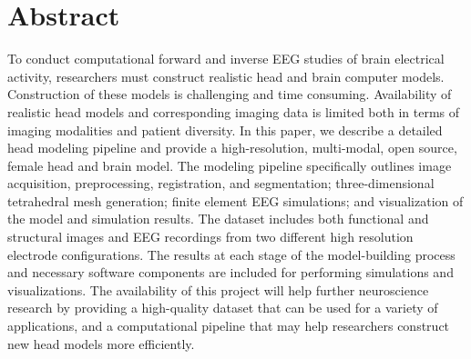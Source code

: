 %

\section*{Abstract}

To conduct computational forward and inverse EEG studies of brain electrical activity, researchers must construct realistic head and brain computer models. Construction of these models is challenging and time consuming. Availability of realistic head models and corresponding imaging data is limited both in terms of imaging modalities and patient diversity. In this paper, we describe a detailed head modeling pipeline and provide a high-resolution, multi-modal, open source, female head and brain model. The modeling pipeline specifically outlines image acquisition, preprocessing, registration, and segmentation; three-dimensional tetrahedral mesh generation; finite element EEG simulations; and visualization of the model and simulation results. The dataset includes both functional and structural images and EEG recordings from two different high resolution electrode configurations. The results at each stage of the model-building process and necessary software components are included for performing simulations and visualizations. The availability of this project will help further neuroscience research by providing a high-quality dataset that can be used for a variety of applications, and a computational pipeline that may help researchers construct new head models more efficiently.